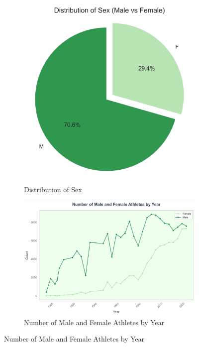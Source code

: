 \documentclass{mcmthesis}
\begin{document}
\begin{figure}[H]
    \centering
    \begin{subfigure}{0.45\textwidth}
        \centering
        \includegraphics[width=\textwidth]{graph/Distribution of Sex.png}
        \caption{Distribution of Sex}
        \label{subfig:player1}
    \end{subfigure}
    \hfill
    \begin{subfigure}{0.45\textwidth}
        \centering
        \includegraphics[width=\textwidth]{graph/Number_of_Athletes_by_Sex.png}
        \caption{Number of Male and Female Athletes by Year}
        \label{subfig:player2}
    \end{subfigure}
    \label{Figure 13}
\end{figure}
\end{document}
